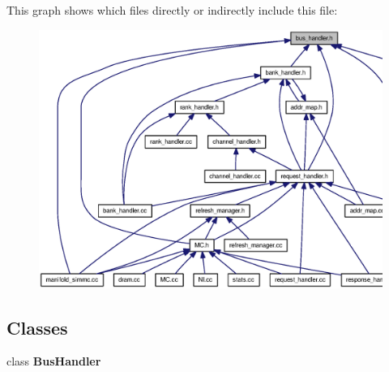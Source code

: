 This graph shows which files directly or indirectly include this file:\nopagebreak
\begin{figure}[H]
\begin{center}
\leavevmode
\includegraphics[width=359pt]{bus__handler_8h__dep__incl}
\end{center}
\end{figure}
\subsection*{Classes}
\begin{CompactItemize}
\item 
class {\bf BusHandler}
\end{CompactItemize}
